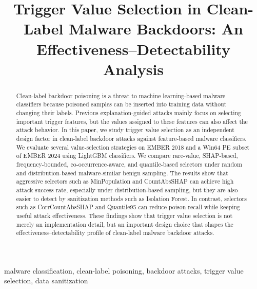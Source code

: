 \documentclass[conference]{IEEEtran}
\begin{document}
\title{Trigger Value Selection in Clean-Label Malware Backdoors: An Effectiveness--Detectability Analysis}

\author{
}

\maketitle

\begin{abstract}
Clean-label backdoor poisoning is a threat to machine learning-based malware classifiers because poisoned samples can be inserted into training data without changing their labels.
Previous explanation-guided attacks mainly focus on selecting important trigger features, but the values assigned to these features can also affect the attack behavior.
In this paper, we study trigger value selection as an independent design factor in clean-label backdoor attacks against feature-based malware classifiers.
We evaluate several value-selection strategies on EMBER 2018 and a Win64 PE subset of EMBER 2024 using LightGBM classifiers.
We compare rare-value, SHAP-based, frequency-bounded, co-occurrence-aware, and quantile-based selectors under random and distribution-based malware-similar benign sampling.
The results show that aggressive selectors such as MinPopulation and CountAbsSHAP can achieve high attack success rate, especially under distribution-based sampling, but they are also easier to detect by sanitization methods such as Isolation Forest.
In contrast, selectors such as CorrCountAbsSHAP and Quantile95 can reduce poison recall while keeping useful attack effectiveness.
These findings show that trigger value selection is not merely an implementation detail, but an important design choice that shapes the effectiveness–detectability profile of clean-label malware backdoor attacks.
\end{abstract}

\begin{IEEEkeywords}
malware classification, clean-label poisoning, backdoor attacks, trigger value selection, data sanitization
\end{IEEEkeywords}








\end{document}
